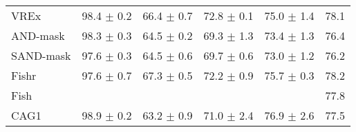 \documentclass{article}
\begin{document}
\begin{center}
{\begin{tabular}{lccccc}
VREx                 & 98.4 $\pm$ 0.2       & 66.4 $\pm$ 0.7       & 72.8 $\pm$ 0.1       & 75.0 $\pm$ 1.4       & 78.1                 \\
AND-mask             & 98.3 $\pm$ 0.3       & 64.5 $\pm$ 0.2       & 69.3 $\pm$ 1.3       & 73.4 $\pm$ 1.3       & 76.4                 \\
SAND-mask            & 97.6 $\pm$ 0.3       & 64.5 $\pm$ 0.6       & 69.7 $\pm$ 0.6       & 73.0 $\pm$ 1.2       & 76.2                 \\
Fishr                & 97.6 $\pm$ 0.7       & 67.3 $\pm$ 0.5       & 72.2 $\pm$ 0.9       & 75.7 $\pm$ 0.3       & 78.2                 \\
Fish                 &                      &                      &                      &                      & 77.8                 \\
\midrule
CAG1                 & 98.9 $\pm$ 0.2       & 63.2 $\pm$ 0.9       & 71.0 $\pm$ 2.4       & 76.9 $\pm$ 2.6       & 77.5                 \\

\bottomrule
\end{tabular}}
\end{center}
\end{document}
